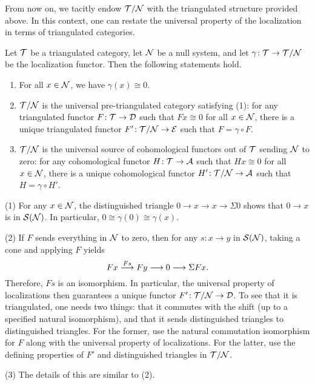 From now on, we tacitly endow \(\mathcal{T}/\mathcal{N}\) with the triangulated structure provided above. In this context, one can restate the universal property of the localization
in terms of triangulated categories.

\begin{theorem}\label{thm:Verdier-quotient-universal-property}
	Let \(\mathcal{T}\) be a triangulated category, let \(\mathcal{N}\) be a null system, and let \(\gamma\!:\mathcal{T}\to\mathcal{T}/\mathcal{N}\) be the localization functor. Then the following statements hold.
	\begin{enumerate}[label=(\arabic*)]
	\item For all \(x\in\mathcal{N}\), we have \(\gamma(x)\cong 0\).
	\item \(\mathcal{T}/\mathcal{N}\) is the universal pre-triangulated category satisfying (1): for any triangulated functor \(F\!:\mathcal{T}\to\mathcal{D}\) such that \(Fx\cong 0\) for all \(x\in\mathcal{N}\),
	there is a unique triangulated functor \(F'\!:\mathcal{T}/\mathcal{N}\to\mathcal{E}\) such that \(F = \gamma\circ F\).
	\item \(\mathcal{T}/\mathcal{N}\) is the universal source of cohomological functors out of \(\mathcal{T}\) sending \(\mathcal{N}\) to zero: for any cohomological functor \(H\!:\mathcal{T}\to\mathcal{A}\) such that
	\(Hx\cong 0\) for all \(x\in\mathcal{N}\), there is a unique cohomological functor \(H'\!:\mathcal{T}/\mathcal{N}\to\mathcal{A}\) such that \(H = \gamma\circ H'\).
	\end{enumerate}
\end{theorem}
\begin{proofsketch}
(1) For any \(x\in\mathcal{N}\), the distinguished triangle \(0\to x \to x\to \Sigma 0\) shows that \(0\to x\) is in \(\mathcal{S}(\mathcal{N})\). In particular, \(0\cong\gamma(0)\cong\gamma(x)\).

(2) If \(F\) sends everything in \(\mathcal{N}\) to zero, then for any \(s\!:x\to y\) in \(\mathcal{S}(\mathcal{N})\), taking a cone and applying \(F\) yields
\[ Fx\overset{Fs}{\longrightarrow} Fy\longrightarrow 0 \longrightarrow \Sigma Fx. \]
Therefore, \(Fs\) is an isomorphism. In particular, the universal property of localizations then guarantees a unique functor \(F'\!:\mathcal{T}/\mathcal{N}\to\mathcal{D}\). To see that it is triangulated,
one needs two things: that it commutes with the shift (up to a specified natural isomorphism), and that it sends distinguished triangles to distinguished triangles. For the former, use
the natural commutation isomorphism for \(F\) along with the universal property of localizations. For the latter, use the defining properties of \(F'\) and distinguished triangles in \(\mathcal{T}/\mathcal{N}\).

(3) The details of this are similar to (2).
\end{proofsketch}


